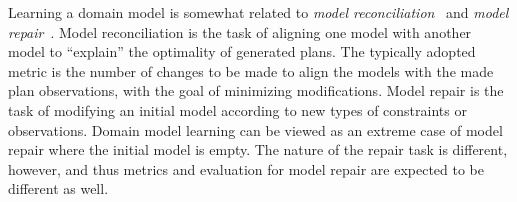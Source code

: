 \documentclass[letterpaper]{article} %
\newif\ifaddcomments
\newcommand{\roni}[1]{\ifaddcomments{\textcolor{red}{[Roni: #1]}}\fi}
\newcommand{\yarin}[1]{\ifaddcomments{\textcolor{teal}{[Yarin: #1]}}\fi}
\newcommand{\leo}[1]{\ifaddcomments{\textcolor{pink}{[Leonardo: #1]}}\fi}
\begin{document}
Learning a domain model is somewhat related to  \emph{model reconciliation}~\citep[inter alia]{ChakrabortiSZK17,SreedharanHMK19} and \emph{model repair}~\citep{bercher2025aSurvey}. 
Model reconciliation is the task of aligning one model with another model to ``explain'' the optimality of generated plans. 
The typically adopted metric is 
the number of changes to be made to align the models with the made plan observations, with the goal of minimizing modifications.
Model repair is the task of modifying an initial model according to new types of constraints or observations. Domain model learning can be viewed as an extreme case of model repair where the initial model is empty. 
The nature of the repair task is different, however, and thus metrics and evaluation for model repair are expected to be different as well. 






\end{document}
